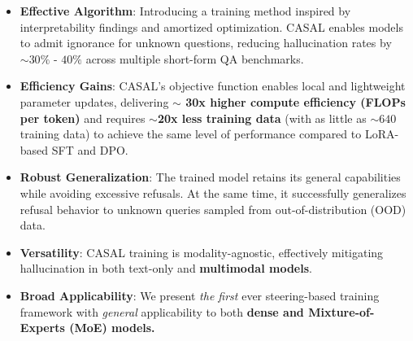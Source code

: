 \documentclass{article} %
\begin{document}
\begin{itemize}
\item \textbf{Effective Algorithm}: Introducing a training method inspired by interpretability findings and amortized optimization. CASAL enables models to admit ignorance for unknown questions, reducing hallucination rates by $\sim 30\%$ - $40\%$ across multiple short-form QA benchmarks.

\item \textbf{Efficiency Gains}: CASAL's objective function enables local and lightweight parameter updates, delivering \textbf{$\sim$ 30x higher compute efficiency (FLOPs per token)} and requires \textbf{$\sim$20x less training data} (with as little as $\sim 640$ training data) to achieve the same level of performance compared to LoRA-based SFT and DPO.

\item \textbf{Robust Generalization}: The trained model retains its general capabilities while avoiding excessive refusals. At the same time, it successfully generalizes refusal behavior to unknown queries sampled from out-of-distribution (OOD) data.

\item \textbf{Versatility}: CASAL training is modality-agnostic, effectively mitigating hallucination in both text-only and {\bfseries multimodal models}.

\item \textbf{Broad Applicability}: We present \textit{the first} ever steering-based training framework with \textit{general} applicability to both {\bfseries dense and Mixture-of-Experts (MoE) models.}
\end{itemize}
\end{document}

